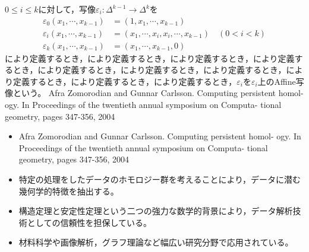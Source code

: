 \documentclass[10.5pt, a4, dvipdfmx, landscape]{article}
\begin{document}
\begin{frame}
  $0 \leq i \leq k$に対して，写像$\varepsilon_i: \Delta^{k - 1} \to \Delta^k$を
  \begin{align*}
    \varepsilon_0 \left( x_1, \cdots, x_{k - 1} \right) & = \left( 1, x_1, \cdots, x_{k - 1} \right)                                               \\
    \varepsilon_i \left( x_1, \cdots, x_{k - 1} \right) & = \left( x_1, \cdots, x_i, x_i, \cdots, x_{k - 1} \right) \quad \left( 0 < i < k \right) \\
    \varepsilon_k \left( x_1, \cdots, x_{k - 1} \right) & = \left( x_1, \cdots, x_{k - 1}, 0 \right)
  \end{align*}
  により定義するとき，により定義するとき，により定義するとき，により定義するとき，により定義するとき，により定義するとき，により定義するとき，により定義するとき，により定義するとき，により定義するとき，$\varepsilon_i$を$\varepsilon_i$上のAffine写像という\cite{tst}。
  Afra Zomorodian and Gunnar Carlsson. Computing persistent homol-
  ogy. In Proceedings of the twentieth annual symposium on Computa-
  tional geometry, pages 347-356, 2004
  \begin{itemize}
    \item Afra Zomorodian and Gunnar Carlsson. Computing persistent homol-
          ogy. In Proceedings of the twentieth annual symposium on Computa-
          tional geometry, pages 347-356, 2004
    \item 特定の処理をしたデータのホモロジー群を考えることにより，データに潜む幾何学的特徴を抽出する。
    \item 構造定理\cite{zomorodian2004computing}と安定性定理\cite{cohen2005stability}という二つの強力な数学的背景により，データ解析技術としての信頼性を担保している。
    \item 材料科学\cite{nakamura2015persistent}\cite{hiraoka2016hierarchical}や画像解析\cite{tanabe2021homological}，グラフ理論\cite{chan2013topology}など幅広い研究分野で応用されている。
  \end{itemize}
\end{frame}

\begin{referenceframe}
  
  
\end{referenceframe}
\end{document}
